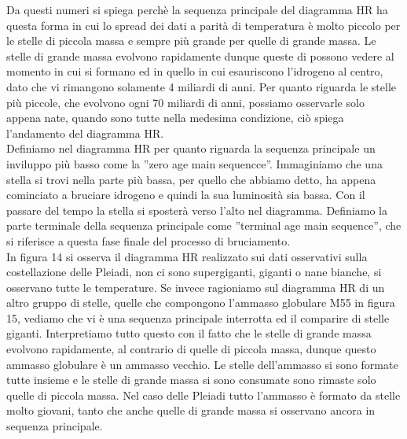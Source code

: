 \documentclass[a4paper,11pt]{article}
\begin{document}
    Da questi numeri si spiega perchè la sequenza principale del diagramma HR ha questa forma in cui lo spread dei dati a parità di temperatura è molto piccolo per le stelle di piccola massa e sempre più grande per quelle di grande massa. Le stelle di grande massa evolvono rapidamente dunque queste di possono vedere al momento in cui si formano ed in quello in cui esauriscono l'idrogeno al centro, dato che vi rimangono solamente 4 miliardi di anni. Per quanto riguarda le stelle più piccole, che evolvono ogni 70 miliardi di anni, possiamo osservarle solo appena nate, quando sono tutte nella medesima condizione, ciò spiega l'andamento del diagramma HR.\\
    Definiamo nel diagramma HR per quanto riguarda la sequenza principale un inviluppo più basso come la ''zero age main sequencce''. Immaginiamo che una stella si trovi nella parte più bassa, per quello che abbiamo detto, ha appena cominciato a bruciare idrogeno e quindi la sua luminosità sia bassa. Con il passare del tempo la stella si sposterà verso l'alto nel diagramma. Definiamo la parte terminale della sequenza principale come ''terminal age main sequence'', che si riferisce a questa fase finale del processo di bruciamento.\\
    In figura 14 si osserva il diagramma HR realizzato sui dati osservativi sulla costellazione delle Pleiadi, non ci sono supergiganti, giganti o nane bianche, si osservano tutte le temperature. Se invece ragioniamo sul diagramma HR di un altro gruppo di stelle, quelle che compongono l'ammasso globulare M55 in figura 15, vediamo che vi è una sequenza principale interrotta ed il comparire di stelle giganti. Interpretiamo tutto questo con il fatto che le stelle di grande massa evolvono rapidamente, al contrario di quelle di piccola massa, dunque questo ammasso globulare è un ammasso vecchio. Le stelle dell'ammasso si sono formate tutte insieme e le stelle di grande massa si sono consumate sono rimaste solo quelle di piccola massa. Nel caso delle Pleiadi tutto l'ammasso è formato da stelle molto giovani, tanto che anche quelle di grande massa si osservano ancora in sequenza principale. 
\end{document}
